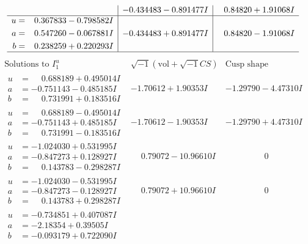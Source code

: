 \documentclass[1p]{elsarticle_modified}
\theoremstyle{definition}
\newcommand{\I}{\sqrt{-1}}
\begin{document}
$$\begin{array}{c|c|c}
 & -0.434483 - 0.891477 I & \phantom{-}0.84820 + 1.91068 I \\ \hline\begin{aligned}
u &= \phantom{-}0.367833 - 0.798582 I \\
a &= \phantom{-}0.547260 - 0.067881 I \\
b &= \phantom{-}0.238259 + 0.220293 I\end{aligned}
 & -0.434483 + 0.891477 I & \phantom{-}0.84820 - 1.91068 I\\
 \hline 
 \end{array}$$\newpage$$\begin{array}{c|c|c}  
\text{Solutions to }I^u_{1}& \I (\text{vol} + \sqrt{-1}CS) & \text{Cusp shape}\\
 \hline 
\begin{aligned}
u &= \phantom{-}0.688189 + 0.495014 I \\
a &= -0.751143 - 0.485185 I \\
b &= \phantom{-}0.731991 + 0.183516 I\end{aligned}
 & -1.70612 + 1.90353 I & -1.29790 - 4.47310 I \\ \hline\begin{aligned}
u &= \phantom{-}0.688189 - 0.495014 I \\
a &= -0.751143 + 0.485185 I \\
b &= \phantom{-}0.731991 - 0.183516 I\end{aligned}
 & -1.70612 - 1.90353 I & -1.29790 + 4.47310 I \\ \hline\begin{aligned}
u &= -1.024030 + 0.531995 I \\
a &= -0.847273 + 0.128927 I \\
b &= \phantom{-}0.143783 - 0.298287 I\end{aligned}
 & \phantom{-}0.79072 - 10.96610 I & \phantom{-0.000000 } 0 \\ \hline\begin{aligned}
u &= -1.024030 - 0.531995 I \\
a &= -0.847273 - 0.128927 I \\
b &= \phantom{-}0.143783 + 0.298287 I\end{aligned}
 & \phantom{-}0.79072 + 10.96610 I & \phantom{-0.000000 } 0 \\ \hline\begin{aligned}
u &= -0.734851 + 0.407087 I \\
a &= -2.18354 + 0.39505 I \\
b &= -0.093179 + 0.722090 I\end{aligned}

\end{array}$$
\end{document}
